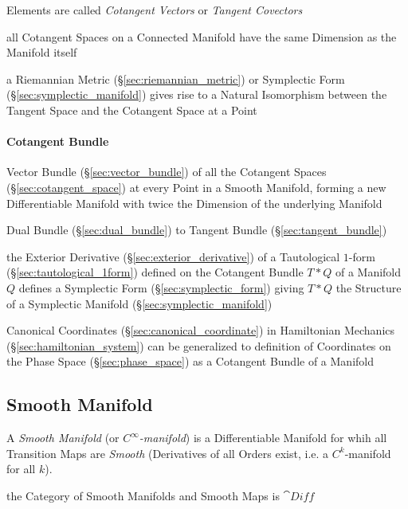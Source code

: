 Elements are called \emph{Cotangent Vectors} or \emph{Tangent Covectors}

all Cotangent Spaces on a Connected Manifold have the same Dimension as the
Manifold itself

a Riemannian Metric (\S\ref{sec:riemannian_metric}) or Symplectic Form
(\S\ref{sec:symplectic_manifold}) gives rise to a Natural Isomorphism between
the Tangent Space and the Cotangent Space at a Point



\paragraph{Cotangent Bundle}\label{sec:cotangent_bundle}\hfill

Vector Bundle (\S\ref{sec:vector_bundle}) of all the Cotangent Spaces
(\S\ref{sec:cotangent_space}) at every Point in a Smooth Manifold, forming a
new Differentiable Manifold with twice the Dimension of the underlying Manifold

Dual Bundle (\S\ref{sec:dual_bundle}) to Tangent Bundle
(\S\ref{sec:tangent_bundle})

the Exterior Derivative (\S\ref{sec:exterior_derivative}) of a Tautological
$1$-form (\S\ref{sec:tautological_1form}) defined on the Cotangent Bundle $T *
Q$ of a Manifold $Q$ defines a Symplectic Form (\S\ref{sec:symplectic_form})
giving $T * Q$ the Structure of a Symplectic Manifold
(\S\ref{sec:symplectic_manifold})

Canonical Coordinates (\S\ref{sec:canonical_coordinate}) in Hamiltonian
Mechanics (\S\ref{sec:hamiltonian_system}) can be generalized to definition of
Coordinates on the Phase Space (\S\ref{sec:phase_space}) as a Cotangent Bundle
of a Manifold



\subsection{Smooth Manifold}\label{sec:smooth_manifold}

A \emph{Smooth Manifold} (or \emph{$C^\infty$-manifold}) is a Differentiable
Manifold for whih all Transition Maps are \emph{Smooth} (Derivatives of
all Orders exist, i.e. a $C^k$-manifold for all $k$).

the Category of Smooth Manifolds and Smooth Maps is $\cat{Diff}$

